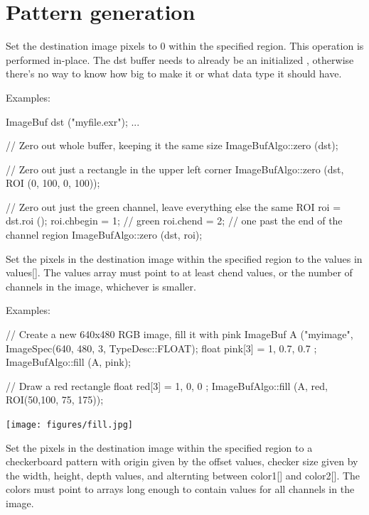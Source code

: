 \section{Pattern generation}
\label{sec:iba:patterns}

 
Set the destination image pixels to 0 within the specified region.
This operation is performed in-place.  The {\cf dst} buffer needs to
already be an initialized \ImageBuf, otherwise there's no way to know how
big to make it or what data type it should have.

\smallskip
\noindent Examples:
\begin{code}
    ImageBuf dst ("myfile.exr");
    ...

    // Zero out whole buffer, keeping it the same size
    ImageBufAlgo::zero (dst);

    // Zero out just a rectangle in the upper left corner
    ImageBufAlgo::zero (dst, ROI (0, 100, 0, 100));

    // Zero out just the green channel, leave everything else the same
    ROI roi = dst.roi ();
    roi.chbegin = 1; // green
    roi.chend = 2;   // one past the end of the channel region
    ImageBufAlgo::zero (dst, roi);
\end{code}
\apiend

 
Set the pixels in the destination image within the specified region
to the values in {\cf values[]}.  The {\cf
  values} array must point to at least {\cf chend} values, or the
number of channels in the image, whichever is smaller.

\smallskip
\noindent Examples:
\begin{code}
    // Create a new 640x480 RGB image, fill it with pink
    ImageBuf A ("myimage", ImageSpec(640, 480, 3, TypeDesc::FLOAT);
    float pink[3] = { 1, 0.7, 0.7 };
    ImageBufAlgo::fill (A, pink);

    // Draw a red rectangle
    float red[3] = { 1, 0, 0 };
    ImageBufAlgo::fill (A, red, ROI(50,100, 75, 175));
\end{code}
\spc \texttt{[image: figures/fill.jpg]}  \\
\apiend


 
Set the pixels in the destination image within the specified region
to a checkerboard pattern with origin given by the {\cf offset} values,
checker size given by the {\cf width, height, depth} values, and 
alternting between {\cf color1[]} and {\cf color2[]}.  The colors must
point to arrays long enough to contain values for all channels in the
image.

